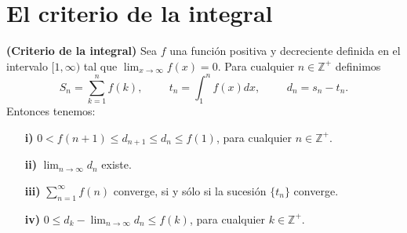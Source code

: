 \section{El criterio de la integral}
\begin{theorem}\textbf{(Criterio de la integral)}
  Sea $f$ una función positiva y decreciente definida en el intervalo $[1,\infty)$ tal que $\lim_{x\to\infty}f(x)=0$. Para cualquier $n\in\mathbb{Z}^+$ definimos
  \begin{equation*}
    S_n=\sum_{k=1}^{n}f(k),\hspace{1cm} t_n=\int_{1}^{n}f(x)dx,\hspace{1cm} d_n=s_n-t_n.
  \end{equation*}
  Entonces tenemos:
  \begin{itemize}
    \item[\textbf{i)}] $0<f(n+1)\leq d_{n+1}\leq d_n \leq f(1)$, para cualquier $n\in\mathbb{Z}^+$.
    \item[\textbf{ii)}] $\lim_{n\to\infty}d_n$ existe.
    \item[\textbf{iii)}] $\sum_{n=1}^\infty f(n)$ converge, si y sólo si la sucesión $\lbrace{t_n\rbrace}$ converge.
    \item[\textbf{iv)}] $0\leq d_k-\lim_{n\to\infty} d_n\leq f(k)$, para cualquier $k\in\mathbb{Z}^+$.
  \end{itemize}
\end{theorem}
  


